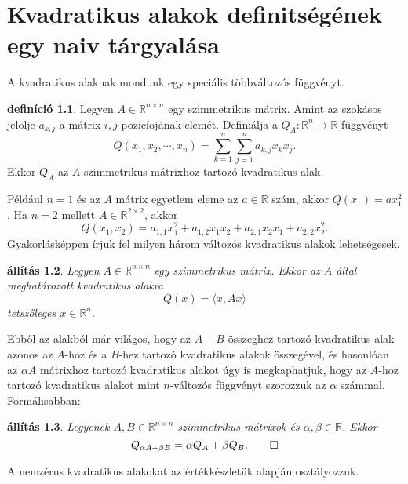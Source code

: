 \documentclass[a4paper, showtrims]{memoir}
\theoremstyle{plain}
\newtheorem{proposition}{állítás}[chapter]
\theoremstyle{remark}
\theoremstyle{definition}
\newtheorem{definition}[proposition]{definíció}
\newcommand{\ip}[2]{\langle#1,#2\rangle}
\begin{document}
\chapter{Kvadratikus alakok definitségének egy naiv tárgyalása}
A kvadratikus alaknak mondunk egy speciális többváltozós függvényt.
\begin{definition}
    Legyen $A\in\mathbb{R}^{n\times n}$ egy szimmetrikus mátrix.
    Amint az szokásos jelölje $a_{k,j}$ a mátrix $i,j$ pozicíojának elemét.
    Definiálja a $Q_A:\mathbb{R}^n\to\mathbb{R}$ függvényt
    \[
    Q\left( x_{1},x_2,\cdots,x_n \right)=
    \sum_{k=1}^n\sum_{j=1}^na_{k,j}x_kx_j.
    \]
    Ekkor $Q_A$ az $A$ szimmetrikus mátrixhoz tartozó kvadratikus alak.
\end{definition}
Például $n=1$ és az $A$ mátrix egyetlem eleme az $a\in\mathbb{R}$ szám, akkor $Q(x_1)=ax_1^2$.
Ha $n=2$ mellett $A\in\mathbb{R}^{2\times 2}$, akkor
$$
Q\left( x_1,x_2 \right)=a_{1,1}x_1^2+a_{1,2}x_1x_2+a_{2,1}x_2x_1+a_{2,2}x_2^2.
$$
Gyakorlásképpen írjuk fel milyen három változós kvadratikus alakok lehetségesek.
\begin{proposition}
    Legyen $A\in\mathbb{R}^{n\times n}$ egy szimmetrikus mátrix.
    Ekkor az $A$ által meghatározott kvadratikus alakra
    \[
        Q(x)=\ip{x}{Ax}
    \]
    tetszőleges $x\in\mathbb{R}^n.$
\end{proposition}
Ebből az alakból már világos, hogy az $A+B$ összeghez tartozó kvadratikus alak azonos az $A$-hoz és a $B$-hez
tartozó kvadratikus alakok összegével, 
és hasonlóan az $\alpha A$ mátrixhoz tartozó kvadratikus alakot úgy is megkaphatjuk, hogy az $A$-hoz tartozó kvadratikus alakot mint $n$-változós függvényt szorozzuk az $\alpha$ számmal.
Formálisabban:
\begin{proposition}
    Legyenek $A,B\in\mathbb{R}^{n\times n}$ szimmetrikus mátrixok és $\alpha,\beta\in\mathbb{R}$.
    Ekkor
    \[
    Q_{\alpha A+\beta B}=\alpha Q_A+\beta Q_B.
    \qedhere
    \]
\end{proposition}
A nemzérus kvadratikus alakokat az értékkészletük alapján osztályozzuk.
\end{document}
